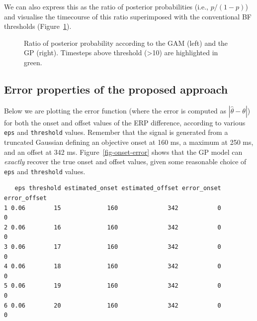 \documentclass[
  doc,
  floatsintext,
  longtable,
  a4paper,
  nolmodern,
  notxfonts,
  notimes,
  colorlinks=true,linkcolor=blue,citecolor=blue,urlcolor=blue]{apa7}
\begin{document}
We can also express this as the ratio of posterior probabilities (i.e.,
\(p/(1-p)\)) and visualise the timecourse of this ratio superimposed
with the conventional BF thresholds (Figure~\ref{fig-post-prob-ratio}).

\begin{figure}[!htb]

\caption{\label{fig-post-prob-ratio}Ratio of posterior probability
according to the GAM (left) and the GP (right). Timesteps above
threshold (\textgreater10) are highlighted in green.}


\end{figure}%

\newpage

\subsection{Error properties of the proposed
approach}\label{error-properties-of-the-proposed-approach}

Below we are plotting the error function (where the error is computed as
\(|\hat{\theta}-\theta|\)) for both the onset and offset values of the
ERP difference, according to various \texttt{eps} and \texttt{threshold}
values. Remember that the signal is generated from a truncated Gaussian
defining an objective onset at 160 ms, a maximum at 250 ms, and an
offset at 342 ms. Figure~\ref{fig-onset-error} shows that the GP model
can \emph{exactly} recover the true onset and offset values, given some
reasonable choice of \texttt{eps} and \texttt{threshold} values.

\begin{verbatim}
   eps threshold estimated_onset estimated_offset error_onset error_offset
1 0.06        15             160              342           0            0
2 0.06        16             160              342           0            0
3 0.06        17             160              342           0            0
4 0.06        18             160              342           0            0
5 0.06        19             160              342           0            0
6 0.06        20             160              342           0            0
\end{verbatim}
\end{document}
